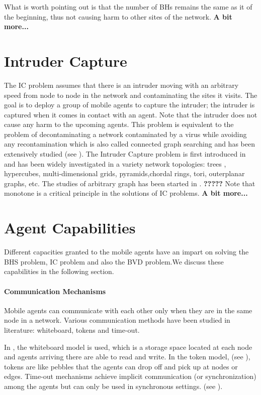 What is worth pointing out is that the number of BHs remains the same as it of the beginning, thus not causing harm to other sites of the network.
 {\bf A bit more...}

\section{Intruder Capture}
The IC problem assumes that there is an intruder moving with an arbitrary speed from node to node in the network and contaminating the sites it visits. The goal is to deploy a group of mobile agents to capture the intruder; the intruder is captured when it comes in contact with an agent. Note that the intruder does not cause any harm to the upcoming agents. This problem is equivalent to the problem of decontaminating a network contaminated by a virus while avoiding any recontamination which is also called connected graph searching and has been extensively studied (see \cite{fomin}).  The Intruder Capture problem is first introduced in \cite{flocchini} and has been widely investigated in a variety network topologies: trees \cite{flocchini, flocchini1,treeintruder}, hypercubes\cite{flocchini2}, multi-dimensional grids\cite{flocchini2}, pyramids\cite{shar},chordal rings\cite{flocchini3}, tori\cite{floc3}, outerplanar graphs\cite{iman}, etc. The studies of arbitrary graph has been started in \cite{nisse,nisse1}. {\bf ?????} Note that monotone is a critical principle in the solutions of IC problems.  
 {\bf A bit more...}

\section{Agent Capabilities}
Different capacities granted to the mobile agents have an impart on solving the BHS problem, IC problem and also the BVD problem.We discuss these capabilities in the following section.

\paragraph{Communication Mechanisms} 
Mobile agents can communicate with each other only when they are in the same node in a network. 
Various  communication methods have been studied in literature: whiteboard, tokens and time-out.  

 In \cite{jc, dobr, flocchini4, ak}, the whiteboard model is used, which is a storage space located at each node and agents arriving there are able to read and write. In the token model, (see \cite{ jc1, flocchini4}), tokens are like pebbles that    the agents can drop   off and pick up  at nodes or edges. Time-out mechanisms achieve implicit communication (or synchronization) among the agents but  can only be used in synchronous settings. (see \cite{cc,cc1,jc2}).


